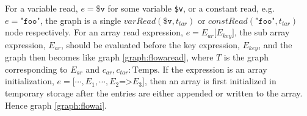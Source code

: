 \begin{graph}
{\begin{adjustbox}{max size={.24\textwidth}{.25\textheight}}
\end{adjustbox}}%
\hspace*{\fill}
\end{graph}

For a variable read, $e = \texttt{\$v}$ for some variable \texttt{\$v}, or a constant read, e.g. $e = \texttt{"foo"}$, the graph is a single $\mathit{varRead}(\texttt{\$v}, t_{tar})$ or $\mathit{constRead}(\texttt{"foo"}, t_{tar})$ node respectively. For an array read expression, $e = E_{ar}\texttt[E_{key}\texttt{]}$, the sub array expression, $E_{ar}$, should be evaluated before the key expression, $E_{key}$, and the graph then becomes like graph \ref{graph:flowaread}, where $T$ is the graph corresponding to $E_{ar}$ and $c_{ar}, c_{tar} : \text{Temps}$. If the expression is an array initialization, $e = \texttt{[}\cdots, E_1, \cdots, E_2\texttt{=>}E_3\texttt{]}$, then an array is first initialized in temporary storage after the entries are either appended or written to the array. Hence graph \ref{graph:flowai}.
